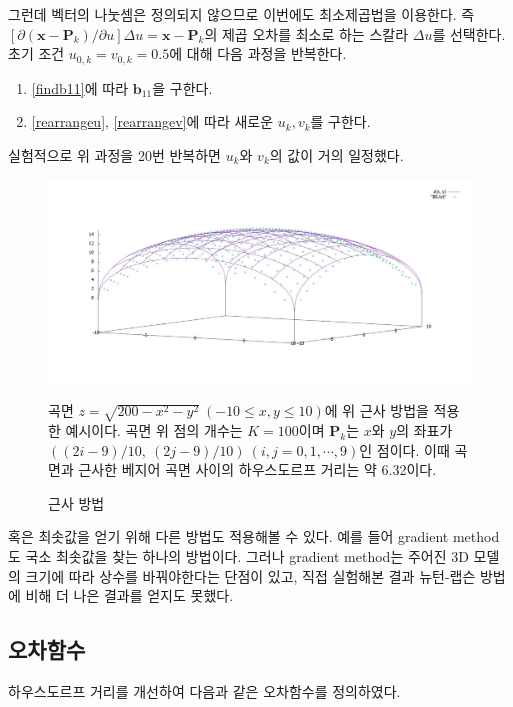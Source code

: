 \documentclass[10pt]{gshs-report-v2.0}
\theoremstyle{theorem}
\theoremstyle{lemma}
\theoremstyle{definition}
\begin{document}
그런데 벡터의 나눗셈은 정의되지 않으므로 이번에도 최소제곱법을 이용한다. 즉 $[\partial(\mathbf{x}-\mathbf{P}_k)/\partial u] \Delta u = \mathbf{x}-\mathbf{P}_k$의 제곱 오차를 최소로 하는 스칼라 $\Delta u$를 선택한다. \\

초기 조건 $u_{0, k}=v_{0, k}=0.5$에 대해 다음 과정을 반복한다. 
\begin{enumerate}
	\item \cref{findb11}에 따라 $\mathbf{b}_{11}$을 구한다. 
	\item \cref{rearrangeu}, \cref{rearrangev}에 따라 새로운 $u_k, v_k$를 구한다. 
\end{enumerate}

실험적으로 위 과정을 20번 반복하면 $u_k$와 $v_k$의 값이 거의 일정했다. 

\begin{figure}[h]
	\centering
	\includegraphics[width=\textwidth]{leastSquare}
	\caption{근사 방법}
	\small 곡면 $z=\sqrt{200-x^2-y^2}\ (-10 \leq x, y \leq 10)$에 위 근사 방법을 적용한 예시이다. 곡면 위 점의 개수는 $K=100$이며 $\mathbf{P}_k$는 $x$와 $y$의 좌표가 $((2i-9)/10,\ (2j-9)/10)\ (i, j = 0, 1, \cdots, 9)$인 점이다. 이때 곡면과 근사한 베지어 곡면 사이의 하우스도르프 거리는 약 6.32이다.
\end{figure}

혹은 최솟값을 얻기 위해 다른 방법도 적용해볼 수 있다. 예를 들어 gradient method도 국소 최솟값을 찾는 하나의 방법이다. 그러나 gradient method는 주어진 3D 모델의 크기에 따라 상수를 바꿔야한다는 단점이 있고, 직접 실험해본 결과 뉴턴-랩슨 방법에 비해 더 나은 결과를 얻지도 못했다. 

\subsection{오차함수}
하우스도르프 거리를 개선하여 다음과 같은 오차함수를 정의하였다. 
\end{document}
